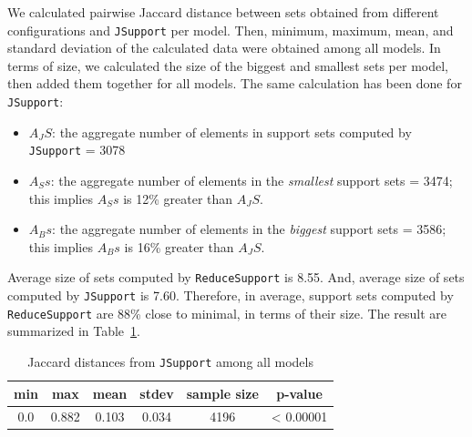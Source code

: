 We calculated pairwise Jaccard distance between sets obtained from different configurations and \texttt{JSupport} per model. Then, minimum, maximum, mean, and standard deviation of the calculated data were obtained among all models. In terms of size, we calculated the size of the biggest and smallest sets per model, then added them together for all models. The same calculation has been done for \texttt{JSupport}:
\begin{itemize}
  \item $A_JS$: the aggregate number of elements in support sets computed by \texttt{JSupport} = 3078
  \item $A_Ss$: the aggregate number of elements in the \emph{smallest} support sets = 3474; 
  this implies $A_Ss$ is 12\% greater than $A_JS$.
  \item $A_Bs$: the aggregate number of elements in the \emph{biggest} support sets = 3586; 
  this implies $A_Bs$ is 16\% greater than $A_JS$. 
\end{itemize}
Average size of sets computed by \texttt{ReduceSupport} is 8.55. And, average size of sets computed by \texttt{JSupport} is 7.60. Therefore, in average, support sets computed by \texttt{ReduceSupport} are 88\% close to minimal, in terms of their size.
The result are summarized in Table~\ref{tab:jsupjac}.

\begin{table}
  \centering
  \begin{tabular}{ |c|c|c|c|c|c| }
    \hline
     min & max & mean & stdev & sample size& p-value\\[0.5ex]
    \hline
     0.0   & 0.882 & 0.103 & 0.034 & 4196 & < 0.00001 \\[0.5ex]
    \hline
  \end{tabular}
  \caption{Jaccard distances from \texttt{JSupport} among all models}
  \label{tab:jsupjac}
\end{table}


